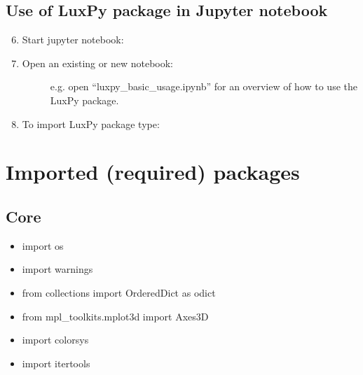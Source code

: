\documentclass[letterpaper,10pt,english]{sphinxmanual}
\begin{document}
\section{Use of LuxPy package in Jupyter notebook}
\label{\detokenize{installation:use-of-luxpy-package-in-jupyter-notebook}}\begin{enumerate}
\setcounter{enumi}{5}
\item {} 
Start jupyter notebook:
\begin{quote}

\end{quote}

\item {} \begin{description}
\item[{Open an existing or new notebook:}] \leavevmode
e.g. open “luxpy\_basic\_usage.ipynb” for an overview of how to use the LuxPy package.

\end{description}

\item {} 
To import LuxPy package type:
\begin{quote}

\end{quote}

\end{enumerate}


\chapter{Imported (required) packages}
\label{\detokenize{required_packages:imported-required-packages}}\label{\detokenize{required_packages::doc}}

\section{Core}
\label{\detokenize{required_packages:core}}\begin{itemize}
\item {} 
import os

\item {} 
import warnings

\item {} 
from collections import OrderedDict as odict

\item {} 
from mpl\_toolkits.mplot3d import Axes3D

\item {} 
import colorsys

\item {} 
import itertools

\end{itemize}
\end{document}
